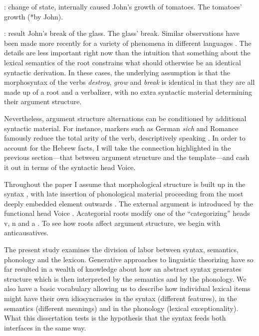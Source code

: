 \pex {}: change of state, internally caused
\a \ljudge{*} John's growth of tomatoes.
\a The tomatoes' growth (*by John).
\xe

\pex {}: result
\a \ljudge{*} John's break of the glass.
\a \ljudge{*} The glass' break.
\xe
Similar observations have been made more recently for a variety of phenomena in different languages \citep{haspelmath93,unaccusativity95,schaefer08}. The details are less important right now than the intuition that something about the lexical semantics of the root constrains what should otherwise be an identical syntactic derivation. In these cases, the underlying assumption is that the morphosyntax of the verbs \emph{destroy}, \emph{grow} and \emph{break} is identical in that they are all made up of a root and a verbalizer, with no extra syntactic material determining their argument structure.

Nevertheless, argument structure alternations can be conditioned by additional syntactic material. For instance, markers such as German \emph{sich} and Romance  famously reduce the total arity of the verb, descriptively speaking \citep[e.g.][]{labelle08,schaefer08,cuervo14}. In order to account for the Hebrew facts, I will take the connection highlighted in the previous section---that between argument structure and the template---and cash it out in terms of the syntactic head Voice.

Throughout the paper I assume that morphological structure is built up in the syntax \citep{dm}, with late insertion of phonological material proceeding from the most deeply embedded element outwards \citep{bobaljik00,embick10}. The external argument is introduced by the functional head Voice \citep{kratzer96,pylkkanen08}. Acategorial roots modify one of the ``categorizing'' heads v, n and a \citep{marantz97,arad03,harley14thlia}. To see how roots affect argument structure, we begin with anticausatives.


The present study examines the division of labor between syntax, semantics, phonology and the lexicon. Generative approaches to linguistic theorizing have so far resulted in a wealth of knowledge about how an abstract syntax generates structure which is then interpreted by the semantics and by the phonology. We also have a basic vocabulary allowing us to describe how individual lexical items might have their own idiosyncrasies in the syntax (different features), in the semantics (different meanings) and in the phonology (lexical exceptionality). What this dissertation tests is the hypothesis that the syntax feeds both interfaces in the same way.

